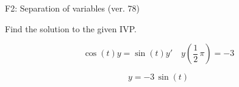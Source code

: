 \begin{exercise}
  \begin{exerciseTitle}F2: Separation of variables (ver. 78)\end{exerciseTitle}
  \begin{exerciseStatement}
    
Find the solution to the given IVP.

    
\[\cos\left(t\right) y= \sin\left(t\right) y'\hspace{1em} y\left( \frac{1}{2} \, \pi \right)= -3\]

  \end{exerciseStatement}
  \begin{exerciseAnswer}
    
\[y= -3 \, \sin\left(t\right)\]

  \end{exerciseAnswer}
\end{exercise}